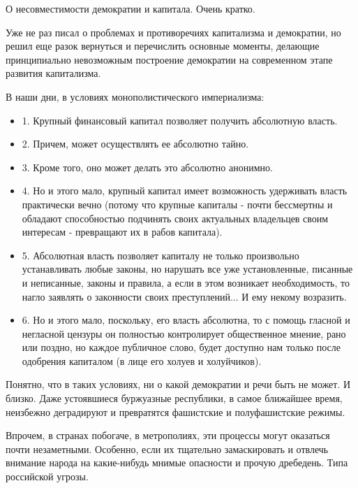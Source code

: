 \begin{itemize}
О несовместимости демократии и капитала. Очень кратко.

Уже не раз писал о проблемах и противоречиях капитализма и демократии, но решил
еще разок вернуться и перечислить основные моменты, делающие принципиально
невозможным построение демократии на современном этапе развития капитализма.

В наши дни, в условиях монополистического империализма:

\begin{itemize}
\item 1. Крупный финансовый капитал позволяет получить абсолютную власть.

\item 2. Причем, может осуществлять ее абсолютно тайно.

\item 3. Кроме того, оно может делать это абсолютно анонимно.

\item 4. Но и этого мало, крупный капитал имеет возможность удерживать власть
практически вечно (потому что крупные капиталы - почти бессмертны и обладают
способностью подчинять своих актуальных владельцев своим интересам - превращают
их в рабов капитала).

\item 5. Абсолютная власть позволяет капиталу не только произвольно устанавливать
любые законы, но нарушать все уже установленные, писанные и неписанные, законы
и правила, а если в этом возникает необходимость, то нагло заявлять о
законности своих преступлений... И ему некому возразить.

\item 6. Но и этого мало, поскольку, его власть абсолютна, то с помощь гласной и
негласной цензуры он полностью контролирует общественное мнение, рано или
поздно, но каждое публичное слово, будет доступно нам только после одобрения
капиталом (в лице его холуев и холуйчиков).
\end{itemize}

Понятно, что в таких условиях, ни о какой демократии и речи быть не может. И
близко. Даже устоявшиеся буржуазные республики, в самое ближайшее время,
неизбежно деградируют и превратятся фашистские и полуфашистские режимы.

Впрочем, в странах побогаче, в метрополиях, эти процессы могут оказаться почти
незаметными. Особенно, если их тщательно замаскировать и отвлечь внимание
народа на какие-нибудь мнимые опасности и прочую дребедень. Типа российской
угрозы.


\end{itemize}
